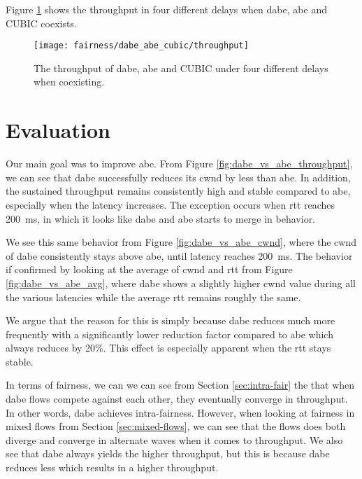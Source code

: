 Figure \ref{fig:dabe_abe_cubic_throughput} shows the throughput in four different delays when \gls{dabe}, \gls{abe} and CUBIC coexists.

\begin{figure}[H]
    \centering
    \texttt{[image: fairness/dabe\_abe\_cubic/throughput]}
    \captionsetup{width=1.0\linewidth}
    \caption{The throughput of \gls{dabe}, \gls{abe} and CUBIC under four different delays when coexisting.}
    \label{fig:dabe_abe_cubic_throughput}
\end{figure}







\section{Evaluation}

Our main goal was to improve \gls{abe}. From Figure \ref{fig:dabe_vs_abe_throughput}, we can see that \gls{dabe} successfully reduces its \gls{cwnd} by less than \gls{abe}. In addition, the sustained throughput remains consistently high and stable compared to \gls{abe}, especially when the latency increases. The exception occurs when \gls{rtt} reaches \SI{200}{ms}, in which it looks like \gls{dabe} and \gls{abe} starts to merge in behavior.

We see this same behavior from Figure \ref{fig:dabe_vs_abe_cwnd}, where the \gls{cwnd} of \gls{dabe} consistently stays above \gls{abe}, until latency reaches \SI{200}{ms}. The behavior if confirmed by looking at the average of \gls{cwnd} and \gls{rtt} from Figure \ref{fig:dabe_vs_abe_avg}, where \gls{dabe} shows a slightly higher \gls{cwnd} value during all the various latencies while the average \gls{rtt} remains roughly the same.

We argue that the reason for this is simply because \gls{dabe} reduces much more frequently with a significantly lower reduction factor compared to \gls{abe} which always reduces by 20\%. This effect is especially apparent when the \gls{rtt} stays stable.


In terms of fairness, we can we can see from Section \ref{sec:intra-fair} the that when \gls{dabe} flows compete against each other, they eventually converge in throughput. In other words, \gls{dabe} achieves intra-fairness. However, when looking at fairness in mixed flows from Section \ref{sec:mixed-flows}, we can see that the flows does both diverge and converge in alternate waves when it comes to throughput. We also see that \gls{dabe} always yields the higher throughput, but this is because \gls{dabe} reduces less which results in a higher throughput.

